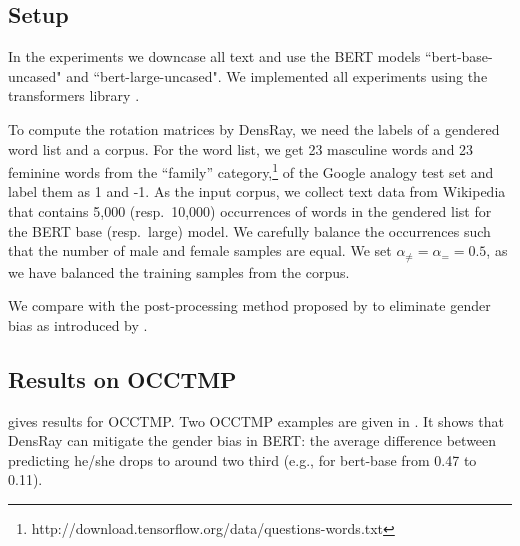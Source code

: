 \subsection{Setup}
In the experiments we downcase all  text  and use the BERT models ``bert-base-uncased" and ``bert-large-uncased". We implemented all experiments using the transformers library \citep{wolf2019huggingfaces}.

To compute the rotation matrices by DensRay, we need the
labels of a gendered word list and a corpus. For the word
list, we get 23 masculine words and 23 feminine words from
the ``family''
category,\footnote{http://download.tensorflow.org/data/questions-words.txt}
of the Google analogy test set \citep{mikolov2013efficient}
and label them as 1 and -1. As the input corpus, we collect
text data from Wikipedia that contains 5,000 (resp.\ 10,000)
occurrences of words in the gendered list for the BERT base
(resp.\ large) model. We carefully balance the occurrences such that the number of male and female samples are equal. We set  $\alpha_{\neq}=\alpha_{=}=0.5$, as we have balanced the training samples from the corpus.

We compare with the post-processing method proposed by
\citet{mu2018all} to eliminate gender bias as
introduced by \citet{karve2019conceptor}. 

\subsection{Results on OCCTMP}
 gives results for OCCTMP. Two OCCTMP
examples are given in . It shows that
DensRay can mitigate the gender bias in BERT: the average
difference between predicting he/she drops to around two
third (e.g., for bert-base from 0.47 to 0.11).


